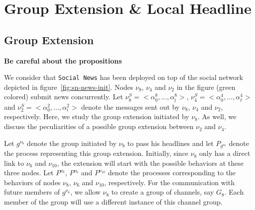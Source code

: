 \section{Group Extension \& Local Headline} %
\label{sec:group_extension_local_headline}

\subsection{Group Extension} %
\label{sub:group_extension}

\textbf{Be careful about the propositions}

We consider that {\tt Social News} has been deployed on top of the social network depicted in
figure~\ref{fig:sn-news-init}. Nodes $\nu_8$, $\nu_4$ and $\nu_2$ in the figure (green colored) submit news concurrently.
Let $\nu_8^S=<\alpha_0^8,\ldots,\alpha_\jmath^8>$, $\nu_4^S=<\alpha_0^4,\ldots,\alpha_\ell^4>$ and
$\nu_2^S=<\alpha_0^2,\ldots,\alpha_\imath^2>$ denote the messages sent out by $\nu_8$, $\nu_4$ and $\nu_2$, respectively.
Here, we study the group extension initiated by $\nu_8$. As well, we discuss the peculiarities of a possible group
extension between $\nu_2$ and $\nu_4$.

Let $g^{\nu_8}$ denote the group initiated by $\nu_8$ to pass his headlines and let $P_{g^{\nu_8}}$ denote the process
representing this group extension. Initially, since $\nu_8$ only has a direct link to $\nu_6$ and $\nu_{10}$, the
extension will start with the possible behaviors at these three nodes. Let $P^{\nu_8}$, $P^{\nu_6}$ and $P^{\nu_{10}}$
denote the processes corresponding to the behaviors of nodes $\nu_8$, $\nu_6$ and $\nu_{10}$, respectively. For the
communication with future members of $g^{\nu_8}$, we allow $\nu_8$ to create a group of channels, say $G_8$. Each member
of the group will use a different instance of this channel group.

